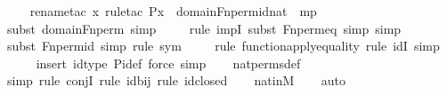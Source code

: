 \begin{isabellebody}
\ \ \ \isamarkupfalse%
{\isacharparenleft}{\kern0pt}rename{\isacharunderscore}{\kern0pt}tac\ x{\isacharcomma}{\kern0pt}\ rule{\isacharunderscore}{\kern0pt}tac\ P{\isacharequal}{\kern0pt}{\isachardoublequoteopen}x\ {\isasymin}\ domain{\isacharparenleft}{\kern0pt}Fn{\isacharunderscore}{\kern0pt}perm{\isacharprime}{\kern0pt}{\isacharparenleft}{\kern0pt}id{\isacharparenleft}{\kern0pt}nat{\isacharparenright}{\kern0pt}{\isacharparenright}{\kern0pt}{\isacharparenright}{\kern0pt}{\isachardoublequoteclose}\ \ mp{\isacharparenright}{\kern0pt}\isanewline
\ \ \ \ \isamarkupfalse%
{\isacharparenleft}{\kern0pt}subst\ domain{\isacharunderscore}{\kern0pt}Fn{\isacharunderscore}{\kern0pt}perm{\isacharprime}{\kern0pt}{\isacharcomma}{\kern0pt}\ simp{\isacharparenright}{\kern0pt}\isanewline
\ \ \ \ \isamarkupfalse%
{\isacharparenleft}{\kern0pt}rule\ impI{\isacharcomma}{\kern0pt}\ subst\ Fn{\isacharunderscore}{\kern0pt}perm{\isacharprime}{\kern0pt}{\isacharunderscore}{\kern0pt}eq{\isacharcomma}{\kern0pt}\ simp{\isacharcomma}{\kern0pt}\ simp{\isacharparenright}{\kern0pt}\isanewline
\ \ \ \ \isamarkupfalse%
{\isacharparenleft}{\kern0pt}subst\ Fn{\isacharunderscore}{\kern0pt}perm{\isacharunderscore}{\kern0pt}id{\isacharcomma}{\kern0pt}\ simp{\isacharcomma}{\kern0pt}\ rule\ sym{\isacharparenright}{\kern0pt}\isanewline
\ \ \ \ \isamarkupfalse%
{\isacharparenleft}{\kern0pt}rule\ function{\isacharunderscore}{\kern0pt}apply{\isacharunderscore}{\kern0pt}equality{\isacharcomma}{\kern0pt}\ rule\ idI{\isacharcomma}{\kern0pt}\ simp{\isacharparenright}{\kern0pt}\isanewline
\ \ \ \ \isamarkupfalse%
{\isacharparenleft}{\kern0pt}insert\ id{\isacharunderscore}{\kern0pt}type\ Pi{\isacharunderscore}{\kern0pt}def{\isacharcomma}{\kern0pt}\ force{\isacharcomma}{\kern0pt}\ simp{\isacharparenright}{\kern0pt}\isanewline
\ \ \isamarkupfalse%
\ nat{\isacharunderscore}{\kern0pt}perms{\isacharunderscore}{\kern0pt}def\isanewline
\ \ \isamarkupfalse%
{\isacharparenleft}{\kern0pt}simp{\isacharcomma}{\kern0pt}\ rule\ conjI{\isacharcomma}{\kern0pt}\ rule\ id{\isacharunderscore}{\kern0pt}bij{\isacharcomma}{\kern0pt}\ rule\ id{\isacharunderscore}{\kern0pt}closed{\isacharparenright}{\kern0pt}\isanewline
\ \ \isamarkupfalse%
\ nat{\isacharunderscore}{\kern0pt}in{\isacharunderscore}{\kern0pt}M\isanewline
\ \ \isamarkupfalse%
\ auto%
\endisatagproof
{\isafoldproof}%
%
\isadelimproof
\isanewline
%
\endisadelimproof
\isanewline

\end{isabellebody}
